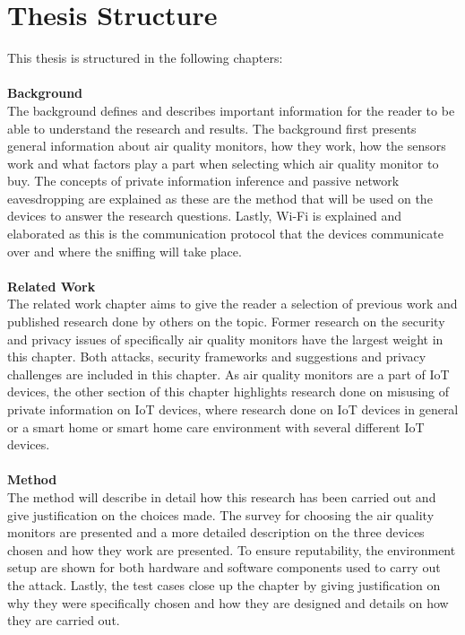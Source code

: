 \section{Thesis Structure}
This thesis is structured in the following chapters:\\\\
\textbf{Background}
\\
The background defines and describes important information for the reader to be able to understand the research and results. The background first presents general information about air quality monitors, how they work, how the sensors work and what factors play a part when selecting which air quality monitor to buy. The concepts of private information inference and passive network eavesdropping are explained as these are the method that will be used on the devices to answer the research questions. Lastly, Wi-Fi is explained and elaborated as this is the communication protocol that the devices communicate over and where the sniffing will take place. 
\\\\
\textbf{Related Work}
\\
The related work chapter aims to give the reader a selection of previous work and published research done by others on the topic. Former research on the security and privacy issues of specifically air quality monitors have the largest weight in this chapter. Both attacks, security frameworks and suggestions and privacy challenges are included in this chapter. As air quality monitors are a part of IoT devices, the other section of this chapter highlights research done on misusing of private information on IoT devices, where research done on IoT devices in general or a smart home or smart home care environment with several different IoT devices. 
\\\\
\textbf{Method}
\\
The method will describe in detail how this research has been carried out and give justification on the choices made. The survey for choosing the air quality monitors are presented and a more detailed description on the three devices chosen and how they work are presented. To ensure reputability, the environment setup are shown for both hardware and software components used to carry out the attack. Lastly, the test cases close up the chapter by giving justification on why they were specifically chosen and how they are designed and details on how they are carried out. 
\\\\
